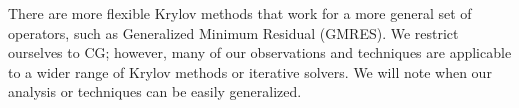 There are more flexible Krylov methods that work for a more general set of operators, such as Generalized Minimum Residual (GMRES).
We restrict ourselves to CG; however, many of our observations and techniques are applicable to a wider range of Krylov methods or iterative solvers.
We will note when our analysis or techniques can be easily generalized.
